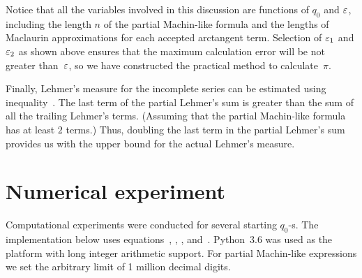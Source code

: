 \documentclass[draft, 10pt]{article} %
\begin{document}
Notice that all the variables involved in this discussion are functions of $q_0$ and $\varepsilon$,
including the length $n$ of the partial Machin-like formula and the lengths of 
Maclaurin approximations for each accepted arctangent term.
Selection of $\varepsilon_1$ and $\varepsilon_2$ as shown above ensures that the maximum
calculation error will be not greater than~$\varepsilon$, so we have constructed the practical
method to calculate~$\pi$.

Finally, Lehmer's measure for the incomplete series can be estimated using
inequality~. The last term of the partial Lehmer's sum is greater than
the sum of all the trailing Lehmer's terms.
(Assuming that the partial Machin-like formula has at least $2$ terms.)
Thus, doubling the last term in the partial Lehmer's sum
provides us with the upper bound for the actual Lehmer's measure.

\section{Numerical experiment}

Computational experiments were conducted for several starting $q_0$-s.
The implementation below uses equations~,
, , and~.
Python~3.6 was used as the platform with long integer arithmetic support.
For partial Machin-like expressions we set the arbitrary limit of 1 million decimal digits.
\end{document}
